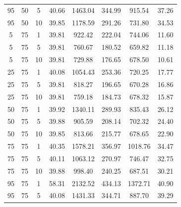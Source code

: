 \begin{table}[H]
\begin{tabular}{ccc|c|c|c|c|c}
95 & 50 & 5 & \cellcolor{gray!42}40.66 & \cellcolor{gray!1}1463.04 & \cellcolor{gray!1}344.99 & \cellcolor{gray!1}915.54 & 37.26\\
95 & 50 & 10 & \cellcolor{gray!50}39.85 & \cellcolor{gray!1}1178.59 & \cellcolor{gray!1}291.26 & \cellcolor{gray!28}731.80 & 34.53\\
5 & 75 & 1 & \cellcolor{gray!50}39.81 & \cellcolor{gray!18}922.42 & \cellcolor{gray!8}222.04 & \cellcolor{gray!25}744.06 & 11.60\\
5 & 75 & 5 & \cellcolor{gray!50}39.81 & \cellcolor{gray!45}760.67 & \cellcolor{gray!47}180.52 & \cellcolor{gray!50}659.82 & 11.18\\
5 & 75 & 10 & \cellcolor{gray!50}39.81 & \cellcolor{gray!50}729.88 & \cellcolor{gray!50}176.65 & \cellcolor{gray!45}678.50 & 10.61\\
25 & 75 & 1 & \cellcolor{gray!48}40.08 & \cellcolor{gray!1}1054.43 & \cellcolor{gray!1}253.36 & \cellcolor{gray!32}720.25 & 17.77\\
25 & 75 & 5 & \cellcolor{gray!50}39.81 & \cellcolor{gray!35}818.27 & \cellcolor{gray!32}196.65 & \cellcolor{gray!47}670.28 & 16.86\\
25 & 75 & 10 & \cellcolor{gray!50}39.81 & \cellcolor{gray!45}759.18 & \cellcolor{gray!43}184.73 & \cellcolor{gray!45}678.32 & 15.87\\
50 & 75 & 1 & \cellcolor{gray!49}39.92 & \cellcolor{gray!1}1340.11 & \cellcolor{gray!1}289.93 & \cellcolor{gray!1}835.43 & 26.12\\
50 & 75 & 5 & \cellcolor{gray!50}39.88 & \cellcolor{gray!21}905.59 & \cellcolor{gray!21}208.14 & \cellcolor{gray!37}702.32 & 24.40\\
50 & 75 & 10 & \cellcolor{gray!50}39.85 & \cellcolor{gray!36}813.66 & \cellcolor{gray!14}215.77 & \cellcolor{gray!45}678.65 & 22.90\\
75 & 75 & 1 & \cellcolor{gray!45}40.35 & \cellcolor{gray!1}1578.21 & \cellcolor{gray!1}356.97 & \cellcolor{gray!1}1018.76 & 34.47\\
75 & 75 & 5 & \cellcolor{gray!48}40.11 & \cellcolor{gray!1}1063.12 & \cellcolor{gray!1}270.97 & \cellcolor{gray!24}746.47 & 32.75\\
75 & 75 & 10 & \cellcolor{gray!50}39.88 & \cellcolor{gray!5}998.40 & \cellcolor{gray!1}240.25 & \cellcolor{gray!42}687.51 & 30.21\\
95 & 75 & 1 & \cellcolor{gray!1}58.31 & \cellcolor{gray!1}2132.52 & \cellcolor{gray!1}434.13 & \cellcolor{gray!1}1372.71 & 40.90\\
95 & 75 & 5 & \cellcolor{gray!48}40.08 & \cellcolor{gray!1}1431.33 & \cellcolor{gray!1}344.71 & \cellcolor{gray!1}887.70 & 39.29\\

\end{tabular}
\end{table}
